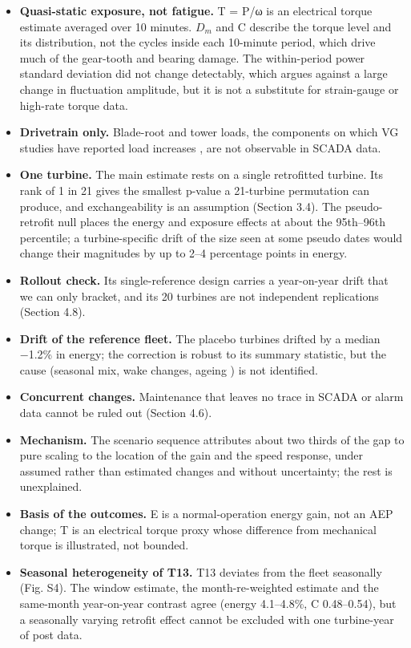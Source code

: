 \documentclass[preprint,12pt]{elsarticle}
\begin{document}
\begin{itemize}
\item
  \textbf{Quasi-static exposure, not fatigue.} T = P/ω is an electrical torque estimate averaged over 10 minutes. \(D_{m}\) and C describe the torque level and its distribution, not the cycles inside each 10-minute period, which drive much of the gear-tooth and bearing damage. The within-period power standard deviation did not change detectably, which argues against a large change in fluctuation amplitude, but it is not a substitute for strain-gauge or high-rate torque data.
\item
  \textbf{Drivetrain only.} Blade-root and tower loads, the components on which VG studies have reported load increases \cite{kim,bak}, are not observable in SCADA data.
\item
  \textbf{One turbine.} The main estimate rests on a single retrofitted turbine. Its rank of 1 in 21 gives the smallest p-value a 21-turbine permutation can produce, and exchangeability is an assumption (Section 3.4). The pseudo-retrofit null places the energy and exposure effects at about the 95th--96th percentile; a turbine-specific drift of the size seen at some pseudo dates would change their magnitudes by up to 2--4 percentage points in energy.
\item
  \textbf{Rollout check.} Its single-reference design carries a year-on-year drift that we can only bracket, and its 20 turbines are not independent replications (Section 4.8).
\item
  \textbf{Drift of the reference fleet.} The placebo turbines drifted by a median −1.2\% in energy; the correction is robust to its summary statistic, but the cause (seasonal mix, wake changes, ageing \cite{staffell14}) is not identified.
\item
  \textbf{Concurrent changes.} Maintenance that leaves no trace in SCADA or alarm data cannot be ruled out (Section 4.6).
\item
  \textbf{Mechanism.} The scenario sequence attributes about two thirds of the gap to pure scaling to the location of the gain and the speed response, under assumed rather than estimated changes and without uncertainty; the rest is unexplained.
\item
  \textbf{Basis of the outcomes.} E is a normal-operation energy gain, not an AEP change; T is an electrical torque proxy whose difference from mechanical torque is illustrated, not bounded.
\item
  \textbf{Seasonal heterogeneity of T13.} T13 deviates from the fleet seasonally (Fig. S4). The window estimate, the month-re-weighted estimate and the same-month year-on-year contrast agree (energy 4.1--4.8\%, C 0.48--0.54), but a seasonally varying retrofit effect cannot be excluded with one turbine-year of post data.
\end{itemize}
\end{document}
